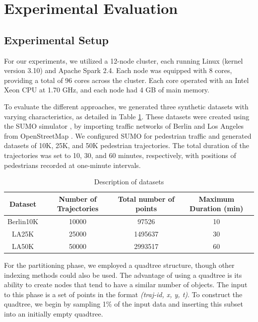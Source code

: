 \section{Experimental Evaluation}
\subsection{Experimental Setup}
For our experiments, we utilized a 12-node cluster, each running Linux (kernel version 3.10) and Apache Spark 2.4. Each node was equipped with 8 cores, providing a total of 96 cores across the cluster. Each core operated with an Intel Xeon CPU at 1.70 GHz, and each node had 4 GB of main memory.

To evaluate the different approaches, we generated three synthetic datasets with varying characteristics, as detailed in Table \ref{tab:datasets}. These 
datasets were created using the SUMO simulator \cite{krajzewicz_recent_2012}, by importing traffic networks of Berlin and Los Angeles from OpenStreetMap 
\cite{haklay_openstreetmap_2008}. We configured SUMO for pedestrian traffic and generated datasets of 10K, 25K, and 50K pedestrian trajectories. The total 
duration of the trajectories was set to 10, 30, and 60 minutes, respectively, with positions of pedestrians recorded at one-minute intervals.

\begin{table}
    \centering
    \caption{Description of datasets}\label{tab:datasets}
    \begin{tabular}{cccc}
        \hline
        Dataset & Number of Trajectories & Total number of points & Maximum Duration (min) \\
        \hline
         Berlin10K &  10000 & 97526 & 10\\ 
         LA25K &  25000 & 1495637 & 30\\
         LA50K &  50000 & 2993517 & 60\\
         \hline
    \end{tabular}
\end{table}

For the partitioning phase, we employed a quadtree structure, though other indexing methods could also be used. The advantage of using a quadtree is its ability to create nodes that tend to have a similar number of objects. The input to this phase is a set of points in the format \textit{(traj-id, x, y, t)}. To construct the quadtree, we begin by sampling 1\% of the input data and inserting this subset into an initially empty quadtree.

